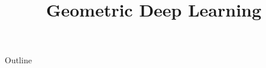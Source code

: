\documentclass[xcolor=dvipsnames,compress,t,pdf,9pt]{beamer}
\title[\insertframenumber /\inserttotalframenumber]{Geometric Deep Learning}
\begin{document}
	\begin{frame}
	\titlepage
	\end{frame}
	
	\begin{frame}{Outline}
	    \tableofcontents
	\end{frame}

	
	
	
\end{document}
